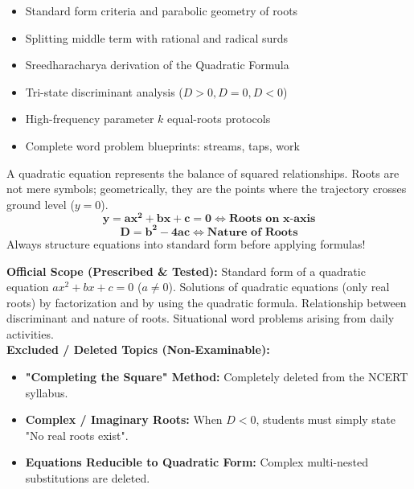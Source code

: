 \documentclass[10pt,a4paper]{article}
\begin{document}
\vspace{3mm}
\begin{minipage}[t]{0.48\textwidth}
  \begin{conceptBox}[title=What This Handbook Includes,fonttitle=\bfseries\color{navy}]
    \begin{itemize}
      \item Standard form criteria and parabolic geometry of roots
      \item Splitting middle term with rational and radical surds
      \item Sreedharacharya derivation of the Quadratic Formula
      \item Tri-state discriminant analysis ($D > 0, D = 0, D < 0$)
      \item High-frequency parameter $k$ equal-roots protocols
      \item Complete word problem blueprints: streams, taps, work
    \end{itemize}
  \end{conceptBox}
\end{minipage}\hfill
\begin{minipage}[t]{0.48\textwidth}
  \begin{formulaBox}[title=Pedagogical Strategy: Foundations First,fonttitle=\bfseries\color{navy}]
    \raggedright A quadratic equation represents the balance of squared relationships. Roots are not mere symbols; geometrically, they are the points where the trajectory crosses ground level ($y = 0$).
    $$\mathbf{y = ax^2 + bx + c = 0 \iff \text{Roots on } x\text{-axis}}$$
    $$\mathbf{D = b^2 - 4ac \iff \text{Nature of Roots}}$$
    Always structure equations into standard form before applying formulas!
  \end{formulaBox}
\end{minipage}

\vspace{1.5mm}
\begin{warningBox}[title=CBSE 2026--27 Curriculum Verification \& Rationalized Scope,fonttitle=\bfseries\color{navy}]
  \textbf{Official Scope (Prescribed \& Tested):} Standard form of a quadratic equation $ax^2 + bx + c = 0$ ($a \neq 0$). Solutions of quadratic equations (only real roots) by factorization and by using the quadratic formula. Relationship between discriminant and nature of roots. Situational word problems arising from daily activities.\\
  \textbf{Excluded / Deleted Topics (Non-Examinable):}
  \begin{itemize}
    \item \textbf{"Completing the Square" Method:} Completely deleted from the NCERT syllabus.
    \item \textbf{Complex / Imaginary Roots:} When $D < 0$, students must simply state "No real roots exist".
    \item \textbf{Equations Reducible to Quadratic Form:} Complex multi-nested substitutions are deleted.
  \end{itemize}
\end{warningBox}
\end{document}
